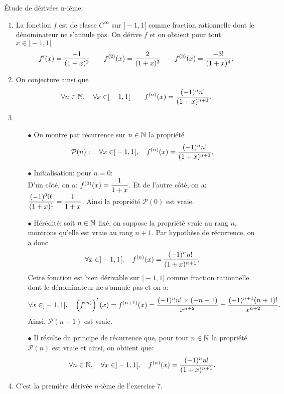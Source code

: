 \documentclass[a4paper, 11pt,reqno]{article}
\begin{document}
\begin{correction}
	\'Etude de d\'eriv\'ees n-i\`eme:
	\begin{enumerate}
		\item La fonction $f$ est de classe $C^{\infty}$ sur $\rbrack -1,1\lbrack$ comme fraction rationnelle dont le d\'enominateur ne s'annule pas.
		      On d\'erive $f$ et on obtient pour tout $x\in\rbrack -1,1\lbrack$
		      $$f^{\prime}(x)=\displaystyle\frac{-1}{(1+x)^2}\qquad f^{(2)}(x)=\displaystyle\frac{2}{(1+x)^3}\qquad f^{(3)}(x)=\displaystyle\frac{-3!}{(1+x)^4}.$$
		\item On conjecture ainsi que
		      $$\forall n\in\mathbb{N},\quad \forall x\in\rbrack -1,1\lbrack\qquad f^{(n)}(x)=\displaystyle\frac{(-1)^n n!}{(1+x)^{n+1}}.$$
		\item
		      \begin{itemize}
			      \item[$\bullet$] On montre par r\'ecurrence sur $n\in\mathbb{N}$ la propri\'et\'e
			            $$\mathcal{P}(n):\quad \forall x\in\rbrack -1,1\lbrack,\quad f^{(n)}(x)=\displaystyle\frac{(-1)^n n!}{(1+x)^{n+1}}.$$
			      \item[$\bullet$]  Initialisation: pour $n=0$:\\
			            \noindent D'un c\^ot\'e, on a: $f^{(0)}(x)=\displaystyle\frac{1}{1+x}$. Et de l'autre c\^ot\'e, on a: $\displaystyle\frac{(-1)^0 0! }{(1+x)^1}=\displaystyle\frac{1}{1+x}$. Ainsi la propri\'et\'e $\mathcal{P}(0)$ est vraie.
			      \item[$\bullet$]  H\'er\'edit\'e: soit $n\in\mathbb{N}$ fix\'e, on suppose la propri\'et\'e vraie au rang $n$, montrons qu'elle est vraie au rang $n+1$. Par hypoth\`ese de r\'ecurrence, on a donc
			            $$\forall x\in\rbrack -1,1\lbrack,\quad f^{(n)}(x)=\displaystyle\frac{(-1)^n n!}{(1+x)^{n+1}}.$$
			            Cette fonction est bien d\'erivable sur $\rbrack -1,1\lbrack$ comme fraction rationnelle dont le d\'enominateur ne s'annule pas et on a:
			            $$\forall x\in\rbrack -1,1\lbrack,\quad \left(f^{(n)}\right)^{\prime}(x)=f^{(n+1)}(x)=\displaystyle\frac{(-1)^n n!\times (-n-1)}{x^{n+2}}=\displaystyle\frac{(-1)^{n+1} (n+1)!}{x^{n+2}}.$$
			            Ainsi, $\mathcal{P}(n+1)$ est vraie.
			      \item[$\bullet$]  Il r\'esulte du principe de r\'ecurrence que, pour tout $n\in\mathbb{N}$ la propri\'et\'e $\mathcal{P}(n)$ est vraie et ainsi, on obtient que:
			            $$\forall n\in\mathbb{N},\quad \forall x\in\rbrack -1,1\lbrack,\quad f^{(n)}(x)=\displaystyle\frac{(-1)^n n!}{(1+x)^{n+1}}.$$
		      \end{itemize}
		\item C'est la premi\`ere d\'eriv\'ee $n$-i\`eme de l'exercice 7.
	\end{enumerate}
\end{correction}
% 
\end{document}
